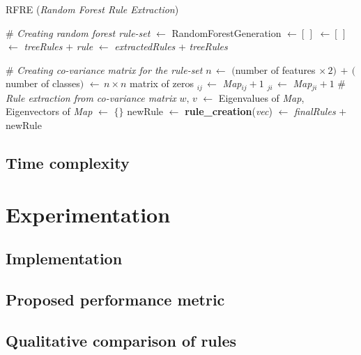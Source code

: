 \documentclass[twoside,11pt]{article}
\begin{document}
\begin{algorithm}[!ht]
\caption{RFRE (\textit{Random Forest Rule Extraction})}\label{alg:RFRE}
\begin{algorithmic}
\State \# {\sl Creating random forest rule-set}
 $\gets$ RandomForestGeneration		
 $\gets [\, ]$
	  $\gets [\,]$
		 $\gets$ {\sl treeRules} $+$ {\sl rule} 
	\EndFor
	 $\gets$ {\sl extractedRules} + {\sl treeRules}
\EndFor

\State
\State \# {\sl Creating co-variance matrix for the rule-set}
\State $n \, \gets$ $($number of features $\times \, 2) \, + \,($number of classes$)$ 
 $\gets \, n\times n$ matrix of zeros
		$_{ij} \, \gets$  {\sl Map}$_{ij} + 1$
		$_{ji} \, \gets$  {\sl Map}$_{ji} + 1$
	\EndIf
\EndFor
\State 
\State \# {\sl Rule extraction from co-variance matrix}
\State $w, \, v$ $\gets$ Eigenvalues of {\sl Map}, Eigenvectors of {\sl Map }
 $\gets$ $\{\}$
	\State newRule $\gets $ \textbf{rule\_creation}({\sl  vec})
	 $\gets$ {\sl finalRules} $+$ newRule
	\EndIf
\EndFor
\State {}
\end{algorithmic}
\end{algorithm}

\subsection{Time complexity}
 
 
\section{Experimentation}
\label{sec:experiment}
\subsection{Implementation}
\subsection{Proposed performance metric}
\subsection{Qualitative comparison of rules}
\end{document}
